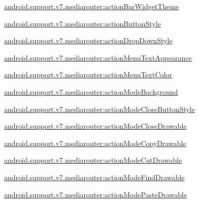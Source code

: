 {\ttfamily \hyperlink{classandroid_1_1support_1_1v7_1_1mediarouter_1_1R_1_1styleable_ae736ca88412d41362ebb97ce89f3bdbf}{android.\+support.\+v7.\+mediarouter\+:action\+Bar\+Widget\+Theme}}

{\ttfamily \hyperlink{classandroid_1_1support_1_1v7_1_1mediarouter_1_1R_1_1styleable_ac290db9607987bf254279ec5666c5b39}{android.\+support.\+v7.\+mediarouter\+:action\+Button\+Style}}

{\ttfamily \hyperlink{classandroid_1_1support_1_1v7_1_1mediarouter_1_1R_1_1styleable_a39e9da7cc34bb8301e1380ffffd867bc}{android.\+support.\+v7.\+mediarouter\+:action\+Drop\+Down\+Style}}

{\ttfamily \hyperlink{classandroid_1_1support_1_1v7_1_1mediarouter_1_1R_1_1styleable_a0dd3111866a20427ceb1e13b7f1e794d}{android.\+support.\+v7.\+mediarouter\+:action\+Menu\+Text\+Appearance}}

{\ttfamily \hyperlink{classandroid_1_1support_1_1v7_1_1mediarouter_1_1R_1_1styleable_aad5d3bda3f4aedec93a8a1407152b908}{android.\+support.\+v7.\+mediarouter\+:action\+Menu\+Text\+Color}}

{\ttfamily \hyperlink{classandroid_1_1support_1_1v7_1_1mediarouter_1_1R_1_1styleable_a80d019b16ff72b30687fa1c88b005f79}{android.\+support.\+v7.\+mediarouter\+:action\+Mode\+Background}}

{\ttfamily \hyperlink{classandroid_1_1support_1_1v7_1_1mediarouter_1_1R_1_1styleable_ae913f582e350a5afee1675a4e71926f6}{android.\+support.\+v7.\+mediarouter\+:action\+Mode\+Close\+Button\+Style}}

{\ttfamily \hyperlink{classandroid_1_1support_1_1v7_1_1mediarouter_1_1R_1_1styleable_a484eb3582d4bbf2518a037875cfd83c2}{android.\+support.\+v7.\+mediarouter\+:action\+Mode\+Close\+Drawable}}

{\ttfamily \hyperlink{classandroid_1_1support_1_1v7_1_1mediarouter_1_1R_1_1styleable_ad1238ac3d940ce0698cf6d13ff787b60}{android.\+support.\+v7.\+mediarouter\+:action\+Mode\+Copy\+Drawable}}

{\ttfamily \hyperlink{classandroid_1_1support_1_1v7_1_1mediarouter_1_1R_1_1styleable_add6ca7722d70aa9fa921307092178367}{android.\+support.\+v7.\+mediarouter\+:action\+Mode\+Cut\+Drawable}}

{\ttfamily \hyperlink{classandroid_1_1support_1_1v7_1_1mediarouter_1_1R_1_1styleable_a247a1523628d74f978947c8ee5b64026}{android.\+support.\+v7.\+mediarouter\+:action\+Mode\+Find\+Drawable}}

{\ttfamily \hyperlink{classandroid_1_1support_1_1v7_1_1mediarouter_1_1R_1_1styleable_a1c9dba2509b8423490c34fd739e56e38}{android.\+support.\+v7.\+mediarouter\+:action\+Mode\+Paste\+Drawable}}

